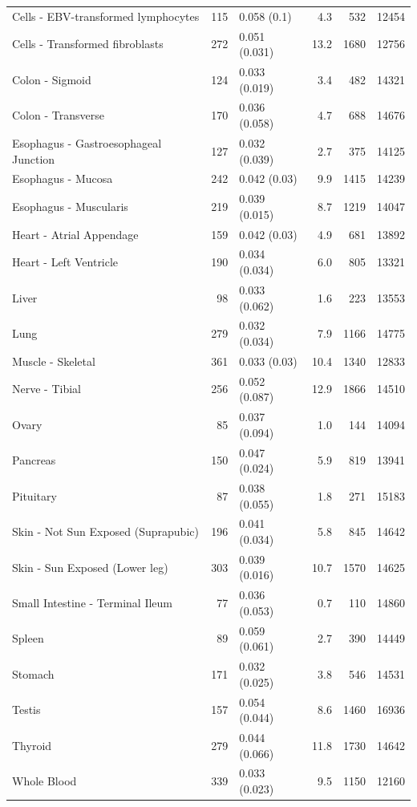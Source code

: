 \documentclass[10pt,letterpaper]{article}
\begin{document}
\begin{table}[!ht]
\begin{adjustwidth}{-2.25in}{0in}
\begin{tabular}{lrlrrr}
  Cells - EBV-transformed lymphocytes & 115 & 0.058 (0.1) & 4.3 & 532 & 12454 \\ 
  Cells - Transformed fibroblasts & 272 & 0.051 (0.031) & 13.2 & 1680 & 12756 \\ 
  Colon - Sigmoid & 124 & 0.033 (0.019) & 3.4 & 482 & 14321 \\ 
  Colon - Transverse & 170 & 0.036 (0.058) & 4.7 & 688 & 14676 \\ 
  Esophagus - Gastroesophageal Junction & 127 & 0.032 (0.039) & 2.7 & 375 & 14125 \\ 
  Esophagus - Mucosa & 242 & 0.042 (0.03) & 9.9 & 1415 & 14239 \\ 
  Esophagus - Muscularis & 219 & 0.039 (0.015) & 8.7 & 1219 & 14047 \\ 
  Heart - Atrial Appendage & 159 & 0.042 (0.03) & 4.9 & 681 & 13892 \\ 
  Heart - Left Ventricle & 190 & 0.034 (0.034) & 6.0 & 805 & 13321 \\ 
  Liver & 98 & 0.033 (0.062) & 1.6 & 223 & 13553 \\ 
  Lung & 279 & 0.032 (0.034) & 7.9 & 1166 & 14775 \\ 
  Muscle - Skeletal & 361 & 0.033 (0.03) & 10.4 & 1340 & 12833 \\ 
  Nerve - Tibial & 256 & 0.052 (0.087) & 12.9 & 1866 & 14510 \\ 
  Ovary & 85 & 0.037 (0.094) & 1.0 & 144 & 14094 \\ 
  Pancreas & 150 & 0.047 (0.024) & 5.9 & 819 & 13941 \\ 
  Pituitary & 87 & 0.038 (0.055) & 1.8 & 271 & 15183 \\ 
  Skin - Not Sun Exposed (Suprapubic) & 196 & 0.041 (0.034) & 5.8 & 845 & 14642 \\ 
  Skin - Sun Exposed (Lower leg) & 303 & 0.039 (0.016) & 10.7 & 1570 & 14625 \\ 
  Small Intestine - Terminal Ileum & 77 & 0.036 (0.053) & 0.7 & 110 & 14860 \\ 
  Spleen & 89 & 0.059 (0.061) & 2.7 & 390 & 14449 \\ 
  Stomach & 171 & 0.032 (0.025) & 3.8 & 546 & 14531 \\ 
  Testis & 157 & 0.054 (0.044) & 8.6 & 1460 & 16936 \\ 
  Thyroid & 279 & 0.044 (0.066) & 11.8 & 1730 & 14642 \\ 
  Whole Blood & 339 & 0.033 (0.023) & 9.5 & 1150 & 12160 \\ 
   \hline
\end{tabular}

\end{adjustwidth}
\end{table}
\end{document}
